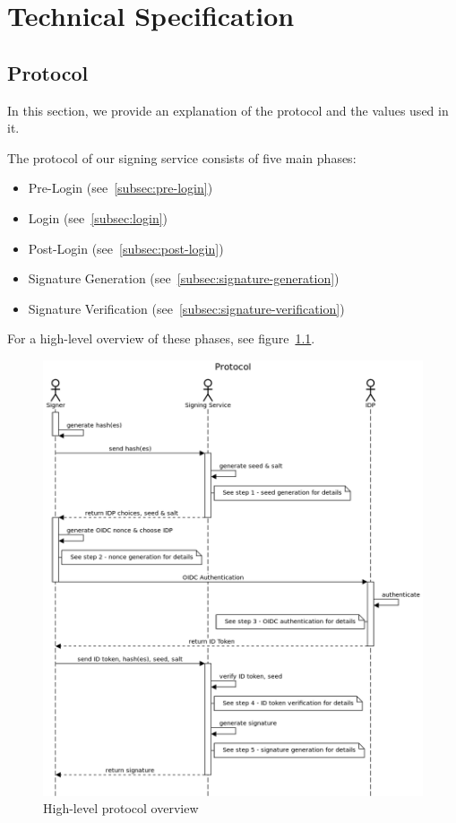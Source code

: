 \chapter{Technical Specification}
\section{Protocol}

In this section, we provide an explanation of the protocol and the values used in it.

The protocol of our signing service consists of five main phases:

\begin{itemize}
	\item Pre-Login (see~\ref{subsec:pre-login})
	\item Login (see~\ref{subsec:login})
	\item Post-Login (see~\ref{subsec:post-login})
	\item Signature Generation (see~\ref{subsec:signature-generation})
	\item Signature Verification (see~\ref{subsec:signature-verification})
\end{itemize}

For a high-level overview of these phases, see figure~\ref{fig:highlevelprotocoloverview}.

\begin{figure}
	\begin{center}
		\includegraphics[scale=0.5]{images/protocol_signature_generation_high_level.png}
		\caption{High-level protocol overview}
		\label{fig:highlevelprotocoloverview}
	\end{center}
\end{figure}

